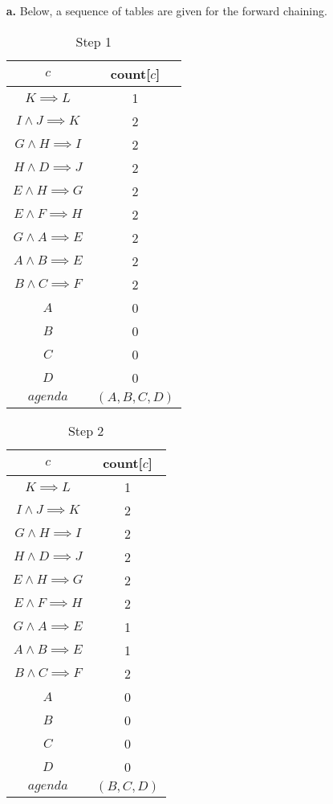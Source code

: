 \documentclass[12pt]{article}
\begin{document}
	\begin{itemize}
		\item[\textbf{a.}] Below, a sequence of tables are given for the forward chaining.
		
\begin{table}[H]
\centering
\caption*{Step 1}
\label{my-label1}
\begin{tabular}{ c c }
\hline
$c$ & count[$c$]\\ \hline
$K \implies L$ & 1\\
$I \land J \implies K$ & 2\\
$G \land H \implies I$ & 2\\
$H \land D \implies J$ & 2\\
$E \land H \implies G$ & 2\\
$E \land F \implies H$ & 2\\
$G \land A \implies E$ & 2\\
$A \land B \implies E$ & 2\\
$B \land C \implies F$ & 2\\
$A$ & 0\\
$B$ & 0\\
$C$ & 0\\
$D$ & 0\\ \hline
$agenda$ & $(A, B, C, D)$
\end{tabular}
\end{table}
		
\begin{table}[H]
\centering
\caption*{Step 2}
\label{my-label1}
\begin{tabular}{ c c }
\hline
$c$ & count[$c$]\\ \hline
$K \implies L$ & 1\\
$I \land J \implies K$ & 2\\
$G \land H \implies I$ & 2\\
$H \land D \implies J$ & 2\\
$E \land H \implies G$ & 2\\
$E \land F \implies H$ & 2\\
$G \land A \implies E$ & 1\\
$A \land B \implies E$ & 1\\
$B \land C \implies F$ & 2\\
$A$ & 0\\
$B$ & 0\\
$C$ & 0\\
$D$ & 0\\ \hline
$agenda$ & $(B, C, D)$
\end{tabular}
\end{table}
		

\end{itemize}
\end{document}
